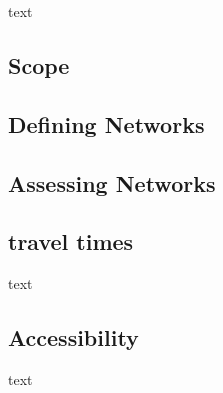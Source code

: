 text

\subsection{Scope}

\subsection{Defining Networks}

\subsection{Assessing Networks}

\subsection{travel times}

text

\subsection{Accessibility}

text